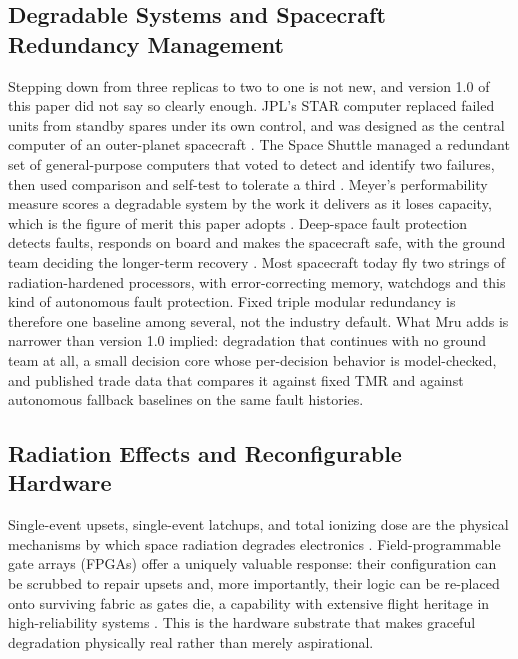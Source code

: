 \documentclass[10pt, a4paper]{article}
\begin{document}
\subsection{Degradable Systems and Spacecraft Redundancy Management}

Stepping down from three replicas to two to one is not new, and version 1.0 of this paper did not say so clearly enough. JPL's STAR computer replaced failed units from standby spares under its own control, and was designed as the central computer of an outer-planet spacecraft \cite{avizienis1971}. The Space Shuttle managed a redundant set of general-purpose computers that voted to detect and identify two failures, then used comparison and self-test to tolerate a third \cite{sklaroff1976, spector1984}. Meyer's performability measure scores a degradable system by the work it delivers as it loses capacity, which is the figure of merit this paper adopts \cite{meyer1980}. Deep-space fault protection detects faults, responds on board and makes the spacecraft safe, with the ground team deciding the longer-term recovery \cite{rasmussen2008}. Most spacecraft today fly two strings of radiation-hardened processors, with error-correcting memory, watchdogs and this kind of autonomous fault protection. Fixed triple modular redundancy is therefore one baseline among several, not the industry default. What Mru adds is narrower than version 1.0 implied: degradation that continues with no ground team at all, a small decision core whose per-decision behavior is model-checked, and published trade data that compares it against fixed TMR and against autonomous fallback baselines on the same fault histories.

\subsection{Radiation Effects and Reconfigurable Hardware}

Single-event upsets, single-event latchups, and total ionizing dose are the physical mechanisms by which space radiation degrades electronics \cite{normand1996, baumann2005, schwank2008}. Field-programmable gate arrays (FPGAs) offer a uniquely valuable response: their configuration can be scrubbed to repair upsets and, more importantly, their logic can be re-placed onto surviving fabric as gates die, a capability with extensive flight heritage in high-reliability systems \cite{wirthlin2015}. This is the hardware substrate that makes graceful degradation physically real rather than merely aspirational.
\end{document}
